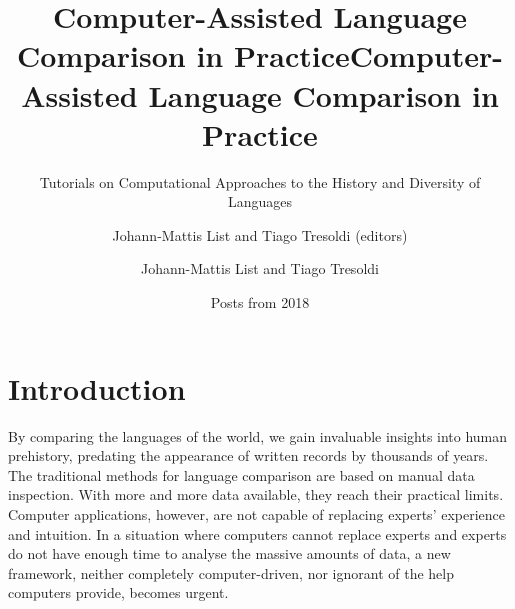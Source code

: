 \documentclass[
  a4paper,
  14pt,
  oneside,
  tablecaptionabove
]{scrbook}
\title{Computer-Assisted Language Comparison in Practice}
\subtitle{Tutorials on Computational Approaches to the History and Diversity of
Languages}
\date{Posts from 2018}
\author{Johann-Mattis List and Tiago Tresoldi (editors)}
\title{Computer-Assisted Language Comparison in Practice}
\author{Johann-Mattis List and Tiago Tresoldi}
\begin{document}

\begin{titlepage}
\afterpage{\restorepagecolor}
\newcommand{\colorRule}[3][black]{\textcolor[HTML]{#1}{\rule{#2}{#3}}}
\end{titlepage}
\restoregeometry




{
\setcounter{tocdepth}{3}
\tableofcontents
\newpage
}
\section*{Introduction}
By comparing the languages of the world, we gain invaluable insights
into human prehistory, predating the appearance of written records by
thousands of years. The traditional methods for language comparison are
based on manual data inspection. With more and more data available, they
reach their practical limits. Computer applications, however, are not
capable of replacing experts' experience and intuition. In a situation
where computers cannot replace experts and experts do not have enough
time to analyse the massive amounts of data, a new framework, neither
completely computer-driven, nor ignorant of the help computers provide,
becomes urgent. 
\end{document}
